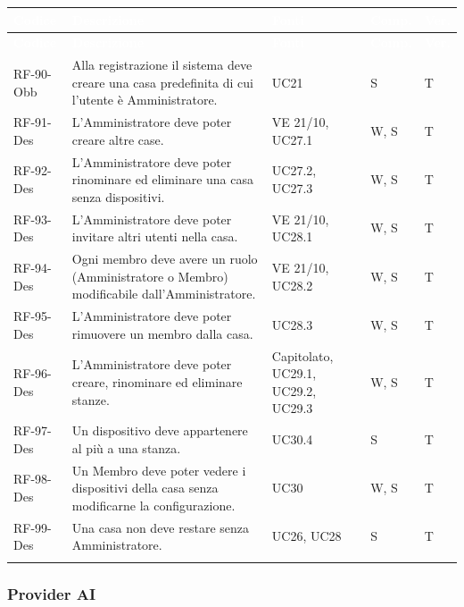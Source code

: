 \documentclass[12pt,a4paper]{article}
\newcommand{\thc}[1]{\textcolor{white}{\textbf{#1}}}
\newcommand{\rl}{\\ \arrayrulecolor{bfline}\hline}
\begin{document}
\begin{longtable}{>{\raggedright\arraybackslash}p{}>{\raggedright\arraybackslash}p{}>{\raggedright\arraybackslash}p{}>{\raggedright\arraybackslash}p{}>{\centering\arraybackslash}p{}}
\rowcolor{bfblue}\thc{Codice} & \thc{Descrizione} & \thc{Fonti} & \thc{Comp.} & \thc{Ver.} \\
\endfirsthead
\rowcolor{bfblue}\thc{Codice} & \thc{Descrizione} & \thc{Fonti} & \thc{Comp.} & \thc{Ver.} \\
\endhead
RF-90-Obb & Alla registrazione il sistema deve creare una casa predefinita di cui l'utente è Amministratore. & UC21 & S & T \rl
RF-91-Des & L'Amministratore deve poter creare altre case. & VE 21/10, UC27.1 & W, S & T \rl
RF-92-Des & L'Amministratore deve poter rinominare ed eliminare una casa senza dispositivi. & UC27.2, UC27.3 & W, S & T \rl
RF-93-Des & L'Amministratore deve poter invitare altri utenti nella casa. & VE 21/10, UC28.1 & W, S & T \rl
RF-94-Des & Ogni membro deve avere un ruolo (Amministratore o Membro) modificabile dall'Amministratore. & VE 21/10, UC28.2 & W, S & T \rl
RF-95-Des & L'Amministratore deve poter rimuovere un membro dalla casa. & UC28.3 & W, S & T \rl
RF-96-Des & L'Amministratore deve poter creare, rinominare ed eliminare stanze. & Capitolato, UC29.1, UC29.2, UC29.3 & W, S & T \rl
RF-97-Des & Un dispositivo deve appartenere al più a una stanza. & UC30.4 & S & T \rl
RF-98-Des & Un Membro deve poter vedere i dispositivi della casa senza modificarne la configurazione. & UC30 & W, S & T \rl
RF-99-Des & Una casa non deve restare senza Amministratore. & UC26, UC28 & S & T \rl
\end{longtable}

\subsubsection{Provider AI}
\end{document}
